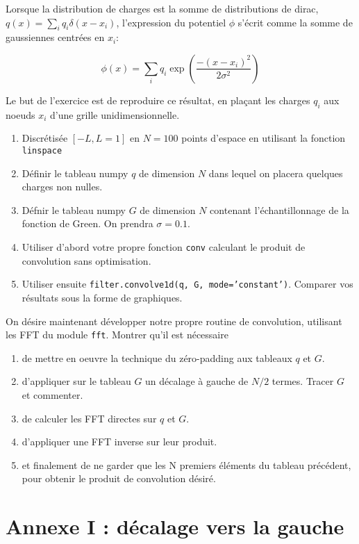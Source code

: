 \documentclass[a4paper, 12pt]{article}
\begin{document}
Lorsque la distribution de charges  est la somme de distributions de dirac, $q(x) = \sum_{i} q_i \delta(x-x_i)$, 
l'expression du potentiel $\phi$ s'écrit comme la somme de gaussiennes centrées en $x_i$:

\begin{equation}
\phi(x)=\sum_i q_i \exp \left(\frac{-(x-x_i)^2}{2 \sigma^2} \right) 
\end{equation}

Le but de l'exercice est de reproduire ce résultat, en plaçant les charges $q_i$ aux noeuds $x_i$ d'une grille unidimensionnelle.
 
\begin{enumerate} 
\item Discrétisée $[-L, L=1]$ en $N=100$ points d'espace en utilisant la fonction {\tt linspace}
\item Définir le tableau numpy $q$ de dimension $N$ dans lequel on placera quelques charges non nulles.
\item Défnir le tableau numpy $G$ de dimension $N$ contenant l'échantillonnage de la fonction de Green. On prendra $\sigma=0.1$.
\item Utiliser d'abord votre propre fonction {\tt conv} calculant le produit de convolution sans optimisation.
\item Utiliser ensuite {\tt filter.convolve1d(q, G, mode='constant')}. Comparer vos résultats sous la forme de graphiques.
\end{enumerate} 


On désire maintenant développer notre propre routine de convolution, utilisant les FFT du module {\tt fft}.
Montrer qu'il est nécessaire 
\begin{enumerate} 
 \item de mettre en oeuvre la technique du zéro-padding aux tableaux $q$ et $G$. 
\item d'appliquer sur le tableau $G$ un décalage à gauche de $N/2$ termes. Tracer
$G$ et commenter.
\item de calculer les FFT directes sur $q$ et $G$.
\item d'appliquer une FFT inverse sur leur produit. 
\item et finalement de ne garder que les N premiers éléments du tableau précédent, pour obtenir le produit de convolution désiré.
\end{enumerate} 

\section{Annexe I : décalage vers la gauche}
\end{document}
